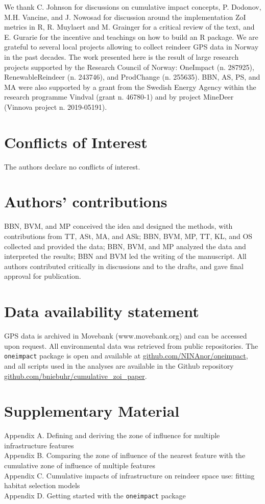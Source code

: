 \documentclass[titlepage]{article}
\begin{document}
We thank C. Johnson for discussions on cumulative impact concepts, P. Dodonov, M.H. Vancine, and J. Nowosad for discussion around the implementation ZoI metrics in R, R. Muylaert and M. Grainger for a critical review of the text, and E. Gurarie for the incentive and teachings on how to build an R package. We are grateful to several local projects allowing to collect reindeer GPS data in Norway in the past decades. The work presented here is the
result of large research projects supported by the Research Council of Norway: OneImpact (n. 287925), RenewableReindeer (n. 243746), and ProdChange (n. 255635). BBN, AS, PS, and MA were also supported by a grant from the Swedish Energy Agency within the research programme Vindval (grant n. 46780-1) and by project MineDeer (Vinnova project n. 2019-05191).

\section*{Conflicts of Interest}

The authors declare no conflicts of interest.

\section*{Authors’ contributions}

BBN, BVM, and MP conceived the idea and designed the methods, with contributions from TT, ASt, MA, and ASk; BBN, BVM, MP, TT, KL, and OS collected and provided the data; BBN, BVM, and MP analyzed the data and interpreted the results; BBN and BVM led the writing of the manuscript. All authors contributed critically in discussions and to the drafts, and gave final approval for publication.

\section*{Data availability statement}

GPS data is archived in Movebank (www.movebank.org) and can be accessed upon request. All environmental data was retrieved from public repositories. The \verb|oneimpact| package is open and available at \url{github.com/NINAnor/oneimpact}, and all scripts used in the analyses are available in the Github repository \url{github.com/bniebuhr/cumulative_zoi_paper}.

\section*{Supplementary Material}

Appendix A. Defining and deriving the zone of influence for multiple infrastructure features \\
Appendix B. Comparing the zone of influence of the nearest feature with the cumulative zone of influence of multiple features \\
Appendix C. Cumulative impacts of infrastructure on reindeer space use: fitting habitat selection models \\
Appendix D. Getting started with the \verb|oneimpact| package \\



\end{document}
